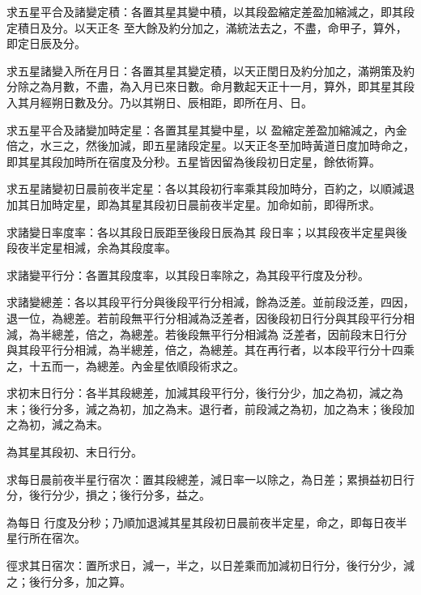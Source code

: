 \begin{pinyinscope}
 求五星平合及諸變定積：各置其星其變中積，以其段盈縮定差盈加縮減之，即其段定積日及分。以天正冬
 至大餘及約分加之，滿統法去之，不盡，命甲子，算外，即定日辰及分。



 求五星諸變入所在月日：各置其星其變定積，以天正閏日及約分加之，滿朔策及約分除之為月數，不盡，為入月已來日數。命月數起天正十一月，算外，即其星其段入其月經朔日數及分。乃以其朔日、辰相距，即所在月、日。



 求五星平合及諸變加時定星：各置其星其變中星，以
 盈縮定差盈加縮減之，內金倍之，水三之，然後加減，即五星諸段定星。以天正冬至加時黃道日度加時命之，即其星其段加時所在宿度及分秒。五星皆因留為後段初日定星，餘依術算。



 求五星諸變初日晨前夜半定星：各以其段初行率乘其段加時分，百約之，以順減退加其日加時定星，即為其星其段初日晨前夜半定星。加命如前，即得所求。



 求諸變日率度率：各以其段日辰距至後段日辰為其
 段日率；以其段夜半定星與後段夜半定星相減，余為其段度率。



 求諸變平行分：各置其段度率，以其段日率除之，為其段平行度及分秒。



 求諸變總差：各以其段平行分與後段平行分相減，餘為泛差。並前段泛差，四因，退一位，為總差。若前段無平行分相減為泛差者，因後段初日行分與其段平行分相減，為半總差，倍之，為總差。若後段無平行分相減為
 泛差者，因前段末日行分與其段平行分相減，為半總差，倍之，為總差。其在再行者，以本段平行分十四乘之，十五而一，為總差。內金星依順段術求之。



 求初末日行分：各半其段總差，加減其段平行分，後行分少，加之為初，減之為末；後行分多，減之為初，加之為末。退行者，前段減之為初，加之為末；後段加之為初，減之為末。



 為其星其段初、末日行分。



 求每日晨前夜半星行宿次：置其段總差，減日率一以除之，為日差；累損益初日行分，後行分少，損之；後行分多，益之。



 為每日
 行度及分秒；乃順加退減其星其段初日晨前夜半定星，命之，即每日夜半星行所在宿次。



 徑求其日宿次：置所求日，減一，半之，以日差乘而加減初日行分，後行分少，減之；後行分多，加之算。




\end{pinyinscope}
